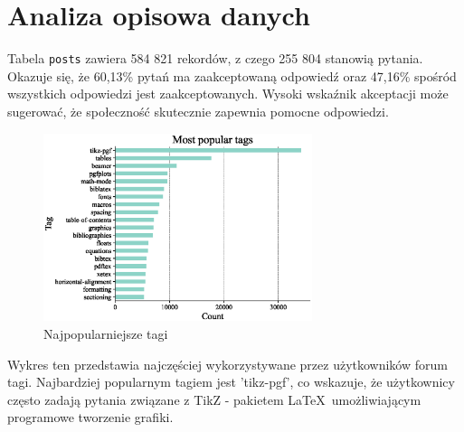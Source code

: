 \documentclass[12pt]{article}
\begin{document}
    \section{Analiza opisowa danych}\label{sec:analiza-opisowa-danych}
	Tabela \verb|posts| zawiera 584 821 rekordów, z czego 255 804 stanowią pytania. Okazuje się, że 60,13\% pytań ma zaakceptowaną odpowiedź oraz 47,16\% spośród wszystkich odpowiedzi jest zaakceptowanych. Wysoki wskaźnik akceptacji może sugerować, że społeczność skutecznie zapewnia pomocne odpowiedzi.
	
	\begin{figure}[H]
		\centering
		\includegraphics[width=0.7\textwidth]{tags_popularity}
		\caption{Najpopularniejsze tagi}
		\label{fig:most-popular-tags}
	\end{figure}
	Wykres ten przedstawia najczęściej wykorzystywane przez użytkowników forum tagi. Najbardziej popularnym tagiem jest 'tikz-pgf', co wskazuje, że użytkownicy często zadają pytania związane z TikZ - pakietem \LaTeX~umożliwiającym programowe tworzenie grafiki. 
	
\end{document}

